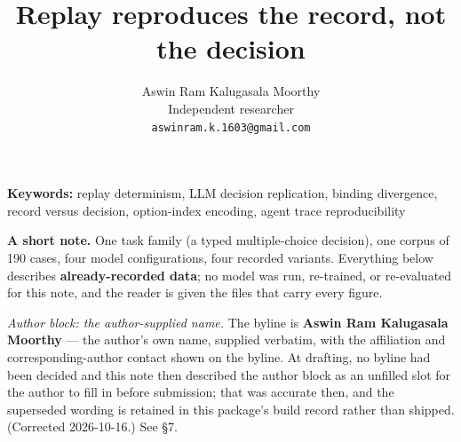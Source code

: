 \documentclass[11pt,a4paper]{article}
\title{Replay reproduces the record, not the decision}
\author{Aswin Ram Kalugasala Moorthy\\ Independent researcher\\ \texttt{aswinram.k.1603@gmail.com}}
\date{}   %
\begin{document}
\maketitle
\noindent\textbf{Keywords:} replay determinism, LLM decision replication, binding divergence, record versus decision, option-index encoding, agent trace reproducibility

\textbf{A short note.} One task family (a typed multiple-choice decision), one corpus of 190 cases, four model configurations, four recorded variants. Everything below describes \textbf{already-recorded data}; no model was run, re-trained, or re-evaluated for this note, and the reader is given the files that carry every figure.

\emph{Author block: the author-supplied name.} The byline is \textbf{Aswin Ram Kalugasala Moorthy} --- the author's own name, supplied verbatim, with the affiliation and corresponding-author contact shown on the byline. At drafting, no byline had been decided and this note then described the author block as an unfilled slot for the author to fill in before submission; that was accurate then, and the superseded wording is retained in this package's build record rather than shipped. (Corrected 2026-10-16.) See \S7.
\end{document}

